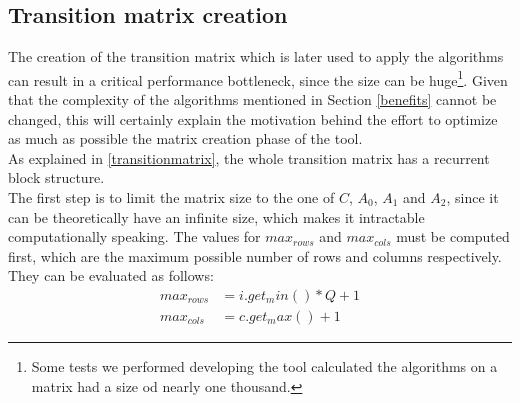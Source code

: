 \subsection{Transition matrix creation}
The creation of the transition matrix which is later used to apply the algorithms can result in a critical performance bottleneck, since the size can be huge\footnote{Some tests we performed developing the tool calculated the algorithms on a matrix had a size od nearly one thousand.}. Given that the complexity of the algorithms mentioned in Section \ref{benefits} cannot be changed, this will certainly explain the motivation behind the effort to optimize as much as possible the matrix creation phase of the tool.\\
As explained in \ref{transitionmatrix}, the whole transition matrix has a recurrent block structure.\\ 
The first step is to limit the matrix size to the one of \( C \), \( A_{0} \), \( A_{1} \) and \( A_{2} \), since it can be theoretically have an infinite size, which makes it intractable computationally speaking. The values for \( max_{rows} \) and \( max_{cols} \) must be computed first, which are the maximum possible number of rows and columns respectively.\\ 
They can be evaluated as follows: 
\begin{equation*}
\begin{split}
  max_{rows} &= i.get_min() * Q + 1 \\
  max_{cols} &= c.get_max() + 1
\end{split}
\end{equation*}

